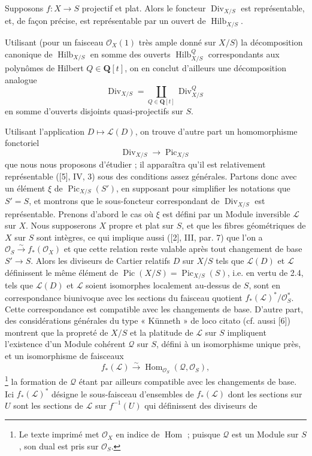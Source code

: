  Supposons $f:X\longrightarrow S$ projectif et plat.
Alors le foncteur $\operatorname{Div}_{X/S}$ est représentable, et, de façon
précise, est représentable par un ouvert de $\operatorname{Hilb}_{X/S}$.

Utilisant (pour un faisceau $\mathcal O_X(1)$ très ample donné sur $X/S$) la
décomposition canonique de $\operatorname{Hilb}_{X/S}$ en somme des ouverts
$\operatorname{Hilb}^{Q}_{X/S}$ correspondants aux polynômes de Hilbert
$Q\in\mathbf Q[t]$, on en conclut d'ailleurs une décomposition analogue
\[
\operatorname{Div}_{X/S}=
\coprod_{Q\in\mathbf Q[t]}\operatorname{Div}^{Q}_{X/S}
\]
en somme d'ouverts disjoints quasi-projectifs sur $S$.

Utilisant l'application $D\longmapsto\mathcal L(D)$, on trouve d'autre part un
homomorphisme fonctoriel
\begin{equation}
\operatorname{Div}_{X/S}\longrightarrow\operatorname{Pic}_{X/S}
\tag{+}
\end{equation}
que nous nous proposons d'étudier ; il apparaîtra qu'il est relativement
représentable ([5], IV, 3) sous des conditions assez générales. Partons donc
avec un élément $\xi$ de $\operatorname{Pic}_{X/S}(S')$, en supposant pour
simplifier les notations que $S'=S$, et montrons que le sous-foncteur
correspondant de $\operatorname{Div}_{X/S}$ est représentable. Prenons d'abord
le cas où $\xi$ est défini par un Module inversible $\mathcal L$ sur $X$. Nous
supposerons $X$ propre et plat sur $S$, et que les fibres géométriques de $X$
sur $S$ sont intègres, ce qui implique aussi ([2], III, par. 7) que l'on a
$\mathcal O_S\xrightarrow{\sim}f_*(\mathcal O_X)$ et que cette relation reste
valable après tout changement de base $S'\longrightarrow S$. Alors les
diviseurs de Cartier relatifs $D$ sur $X/S$ tels que $\mathcal L(D)$ et
$\mathcal L$ définissent le même élément de
$\operatorname{Pic}(X/S)=\operatorname{Pic}_{X/S}(S)$, i.e. en vertu de 2.4,
tels que $\mathcal L(D)$ et $\mathcal L$ soient isomorphes localement au-dessus
de $S$, sont en correspondance biunivoque avec les sections du faisceau
quotient $f_*(\mathcal L)^*/\mathcal O_S^*$. Cette correspondance est compatible
avec les changements de base. D'autre part, des considérations générales du
type « Künneth » de loco citato (cf. aussi [6]) montrent que la propreté de
$X/S$ et la platitude de $\mathcal L$ sur $S$ impliquent l'existence d'un Module
cohérent $\mathcal Q$ sur $S$, défini à un isomorphisme unique près, et un
isomorphisme de faisceaux
\[
f_*(\mathcal L)\xrightarrow{\sim}
\operatorname{Hom}_{\mathcal O_S}(\mathcal Q,\mathcal O_S),
\]
\footnote{Le texte imprimé met $\mathcal O_X$ en indice de
$\operatorname{Hom}$ ; puisque $\mathcal Q$ est un Module sur $S$, son dual
est pris sur $\mathcal O_S$.} la formation de $\mathcal Q$ étant par ailleurs
compatible avec les changements de base. Ici $f_*(\mathcal L)^*$ désigne le
sous-faisceau d'ensembles de $f_*(\mathcal L)$ dont les sections sur $U$ sont
les sections de $\mathcal L$ sur $f^{-1}(U)$ qui définissent des diviseurs de

